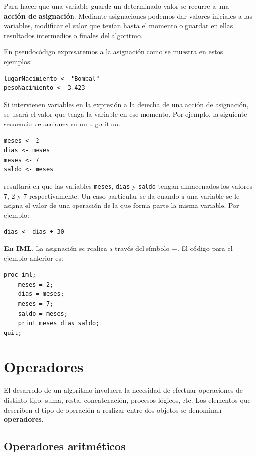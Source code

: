 \documentclass[]{book}
\begin{document}
Para hacer que una variable guarde un determinado valor se recurre a una
\textbf{acción de asignación}. Mediante asignaciones podemos dar valores
iniciales a las variables, modificar el valor que tenían hasta el
momento o guardar en ellas resultados intermedios o finales del
algoritmo.

En pseudocódigo expresaremos a la asignación como se muestra en estos
ejemplos:

\begin{verbatim}
lugarNacimiento <- "Bombal"
pesoNacimiento <- 3.423
\end{verbatim}

Si intervienen variables en la expresión a la derecha de una acción de
asignación, se usará el valor que tenga la variable en ese momento. Por
ejemplo, la siguiente secuencia de acciones en un algoritmo:

\begin{verbatim}
meses <- 2
dias <- meses
meses <- 7
saldo <- meses
\end{verbatim}

resultará en que las variables \texttt{meses}, \texttt{dias} y
\texttt{saldo} tengan almacenados los valores 7, 2 y 7 respectivamente.
Un caso particular se da cuando a una variable se le asigna el valor de
una operación de la que forma parte la misma variable. Por ejemplo:

\begin{verbatim}
dias <- dias + 30
\end{verbatim}

\textbf{En IML}. La asignación se realiza a través del símbolo =. El
código para el ejemplo anterior es:

\begin{verbatim}
proc iml;
    meses = 2;
    dias = meses;
    meses = 7;
    saldo = meses;
    print meses dias saldo;
quit;
\end{verbatim}

\section{Operadores}\label{operadores}

El desarrollo de un algoritmo involucra la necesidad de efectuar
operaciones de distinto tipo: suma, resta, concatenación, procesos
lógicos, etc. Los elementos que describen el tipo de operación a
realizar entre dos objetos se denominan \textbf{operadores}.

\subsection{Operadores aritméticos}\label{operadores-aritmeticos}
\end{document}
